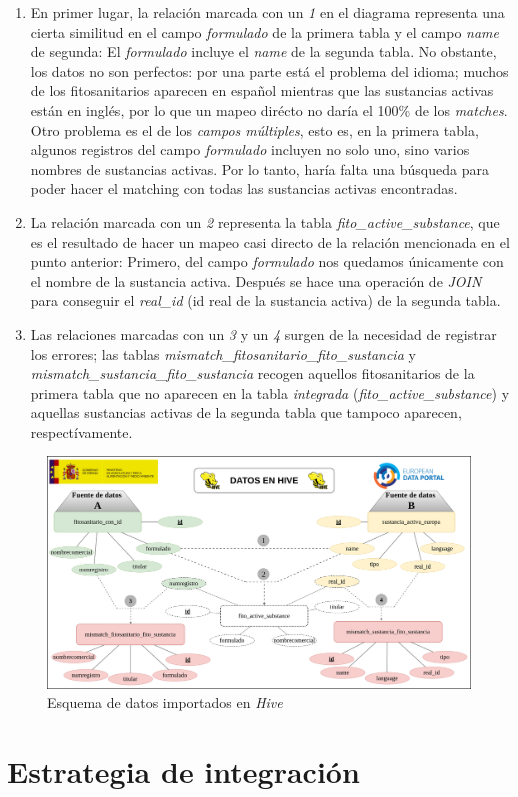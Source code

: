 \begin{enumerate}
\item En primer lugar, la relación marcada con un \textit{1} en el diagrama representa una cierta similitud en el campo \textit{formulado} de la primera tabla y el campo \textit{name} de segunda: El \textit{formulado} incluye el \textit{name} de la segunda tabla. No obstante, los datos no son perfectos: por una parte está el problema del idioma; muchos de los fitosanitarios aparecen en español mientras que las sustancias activas están en inglés, por lo que un mapeo dirécto no daría el 100\% de los \textit{matches}. Otro problema es el de los \textit{campos múltiples}, esto es, en la primera tabla, algunos registros del campo \textit{formulado} incluyen no solo uno, sino varios nombres de sustancias activas. Por lo tanto, haría falta una búsqueda para poder hacer el matching con todas las sustancias activas encontradas.
\item La relación marcada con un \textit{2} representa la tabla \textit{fito\_active\_substance}, que es el resultado de hacer un mapeo casi directo de la relación mencionada en el punto anterior: Primero, del campo \textit{formulado} nos quedamos únicamente con el nombre de la sustancia activa. Después se hace una operación de \textit{JOIN} para conseguir el \textit{real\_id} (id real de la sustancia activa) de la segunda tabla.
\item Las relaciones marcadas con un \textit{3} y un \textit{4} surgen de la necesidad de registrar los errores; las tablas \textit{mismatch\_fitosanitario\_fito\_sustancia} y \textit{mismatch\_sustancia\_fito\_sustancia} recogen aquellos fitosanitarios de la primera tabla que no aparecen en la tabla \textit{integrada} (\textit{fito\_active\_substance}) y aquellas sustancias activas de la segunda tabla que tampoco aparecen, respectívamente.
\end{enumerate}

\begin{landscape}
\begin{figure}[p!]
    \centering
    \includegraphics[width=\linewidth]{Imagenes/datoshive}
    \caption{Esquema de datos importados en \textit{Hive}}
    \label{fig:datoshive}
\end{figure}
\end{landscape}





\section{Estrategia de integración} \label{disenyo.estrategia}

